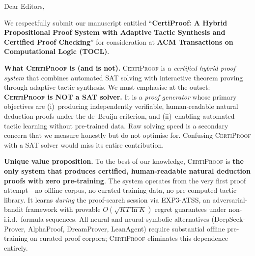 \documentclass[11pt]{letter}
\date{\today}
\newcommand{\CP}{\textsc{CertiProof}}
\begin{document}
\begin{letter}{Dear Editors,}

\opening{}

We respectfully submit our manuscript entitled
``\textbf{CertiProof: A Hybrid Propositional Proof System with Adaptive Tactic Synthesis and Certified Proof Checking}''
for consideration at \textbf{ACM Transactions on Computational Logic (TOCL)}.

\textbf{What \CP{} is (and is not).}
\CP{} is a \emph{certified hybrid proof system} that combines
automated SAT solving with interactive theorem proving through
adaptive tactic synthesis.
We must emphasise at the outset: \textbf{\CP{} is NOT a SAT solver.}
It is a \emph{proof generator} whose primary objectives are
(i)~producing independently verifiable, human-readable natural
deduction proofs under the de~Bruijn criterion, and
(ii)~enabling automated tactic learning without pre-trained data.
Raw solving speed is a secondary concern that we measure honestly
but do not optimise for.  Confusing \CP{} with a SAT solver
would miss its entire contribution.

\textbf{Unique value proposition.}
To the best of our knowledge, \CP{} is \textbf{the only system
that produces certified, human-readable natural deduction proofs
with zero pre-training}.  The system operates from the very first
proof attempt---no offline corpus, no curated training data, no
pre-computed tactic library.  It learns \emph{during} the
proof-search session via EXP3-ATSS, an adversarial-bandit framework
with provable $O(\sqrt{KT\ln K})$ regret guarantees under non-i.i.d.\
formula sequences.  All neural and neural-symbolic alternatives
(DeepSeek-Prover, AlphaProof, DreamProver, LeanAgent) require
substantial offline pre-training on curated proof corpora; \CP{}
eliminates this dependence entirely.


\end{letter}
\end{document}
